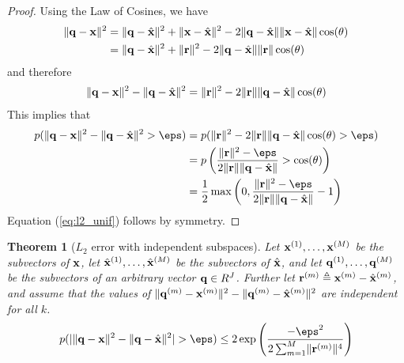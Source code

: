 \documentclass[]{article}
\newtheorem{theorem}{Theorem}[section]
\begin{document}
\begin{proof}
Using the Law of Cosines, we have
\begin{align}
    \lVert\mathbf{q} - \mathbf{x}\rVert^2 &= \lVert\mathbf{q} - \hat{\mathbf{x}}\rVert^2 + \lVert\mathbf{x} - \hat{\mathbf{x}}\rVert^2 - 2\lVert\mathbf{q} - \hat{\mathbf{x}}\rVert\lVert\mathbf{x} - \hat{\mathbf{x}}\rVert\cos(\theta) \nonumber \\
    & = \lVert\mathbf{q} - \hat{\mathbf{x}}\rVert^2 + \lVert\mathbf{r}\rVert^2 - 2\lVert\mathbf{q} - \hat{\mathbf{x}}\rVert\lVert\mathbf{r}\rVert\cos(\theta)
\end{align}
and therefore
\begin{align} \label{eq:l2_diff_cos}
    \lVert\mathbf{q} - \mathbf{x}\rVert^2 - \lVert\mathbf{q} - \hat{\mathbf{x}}\rVert^2 = \lVert\mathbf{r}\rVert^2 - 2\lVert\mathbf{r}\rVert\lVert\mathbf{q} - \hat{\mathbf{x}}\rVert\cos(\theta)
\end{align}
This implies that
\begin{align}
    p(\norm{\q - \x}^2 - \norm{\q - \xhat}^2 > \eps) &= p(\norm{\r}^2 - 2\norm{\r}\norm{\q - \xhat}\cos(\theta) > \eps) \nonumber \\
    &= p \left( \frac{\norm{\r}^2 - \eps }{ 2\norm{\r}\norm{\q - \xhat} } > \cos(\theta) \right) \nonumber \\
    &= \onehalf \max \left( 0, \frac{\norm{\r}^2 - \eps }{ 2\norm{\r}\norm{\q - \xhat} } - 1 \right)
\end{align}
Equation (\ref{eq:l2_unif}) follows by symmetry.

\end{proof}


\begin{theorem}[$L_2$ error with independent subspaces] \label{thm:l2_indep}
Let $\mathbf{x}^{(1)},\ldots,\mathbf{x}^{(M)}$ be the subvectors of $\mathbf{x}$, let $\hat{\mathbf{x}}^{(1)},\ldots,\hat{\mathbf{x}}^{(M)}$ be the subvectors of $\hat{\mathbf{x}}$, and let $\mathbf{q}^{(1)},\ldots,\mathbf{q}^{(M)}$ be the subvectors of an arbitrary vector $\mathbf{q} \in R^J$. Further let $\mathbf{r}^{(m)} \triangleq \mathbf{x}^{(m)} - \hat{\mathbf{x}}^{(m)}$, and assume that the values of $\lVert\mathbf{q}^{(m)} - \mathbf{x}^{(m)} \rVert^2 - \lVert\mathbf{q}^{(m)} - \hat{\mathbf{x}}^{(m)} \rVert^2$ are independent for all $k$. %
\begin{align} \label{eq:l2_indep}
    p(\abs{ \norm{\q - \x}^2 - \norm{\q - \xhat}^2 } > \eps) \le
        2\exp \left( \frac{-\eps^2}{
            2 \sum_{m=1}^M \norm{\r^{(m)}}^4
        }\right)
\end{align}
\end{theorem}
\end{document}
